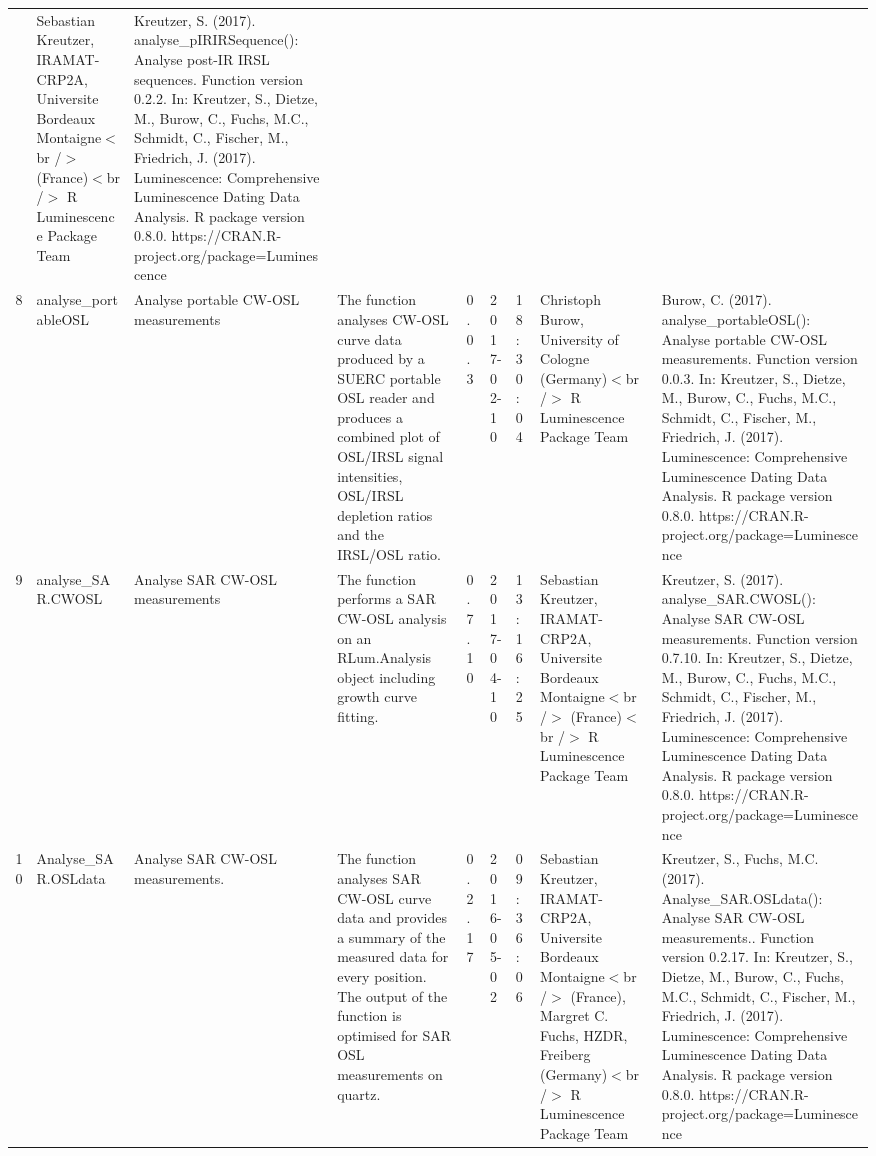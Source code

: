 \begin{table}[ht]
\begin{tabular}{rllllllll}
 & Sebastian Kreutzer, IRAMAT-CRP2A, Universite Bordeaux Montaigne$<$br /$>$ (France)$<$br /$>$  R Luminescence Package Team & Kreutzer, S. (2017). analyse\_pIRIRSequence(): Analyse post-IR IRSL sequences. Function version 0.2.2. In: Kreutzer, S., Dietze, M., Burow, C., Fuchs, M.C., Schmidt, C., Fischer, M., Friedrich, J. (2017). Luminescence: Comprehensive Luminescence Dating Data Analysis. R package version 0.8.0. https://CRAN.R-project.org/package=Luminescence
 \\ 
  8 & analyse\_portableOSL & Analyse portable CW-OSL measurements & The function analyses CW-OSL curve data produced by a SUERC portable OSL reader and produces a combined plot of OSL/IRSL signal intensities, OSL/IRSL depletion ratios and the IRSL/OSL ratio. & 0.0.3 & 2017-02-10 & 18:30:04
 & Christoph Burow, University of Cologne (Germany)$<$br /$>$  R Luminescence Package Team & Burow, C. (2017). analyse\_portableOSL(): Analyse portable CW-OSL measurements. Function version 0.0.3. In: Kreutzer, S., Dietze, M., Burow, C., Fuchs, M.C., Schmidt, C., Fischer, M., Friedrich, J. (2017). Luminescence: Comprehensive Luminescence Dating Data Analysis. R package version 0.8.0. https://CRAN.R-project.org/package=Luminescence
 \\ 
  9 & analyse\_SAR.CWOSL & Analyse SAR CW-OSL measurements & The function performs a SAR CW-OSL analysis on an RLum.Analysis  object including growth curve fitting. & 0.7.10 & 2017-04-10 & 13:16:25
 & Sebastian Kreutzer, IRAMAT-CRP2A, Universite Bordeaux Montaigne$<$br /$>$ (France)$<$br /$>$  R Luminescence Package Team & Kreutzer, S. (2017). analyse\_SAR.CWOSL(): Analyse SAR CW-OSL measurements. Function version 0.7.10. In: Kreutzer, S., Dietze, M., Burow, C., Fuchs, M.C., Schmidt, C., Fischer, M., Friedrich, J. (2017). Luminescence: Comprehensive Luminescence Dating Data Analysis. R package version 0.8.0. https://CRAN.R-project.org/package=Luminescence
 \\ 
  10 & Analyse\_SAR.OSLdata & Analyse SAR CW-OSL measurements. & The function analyses SAR CW-OSL curve data and provides a summary of the measured data for every position. The output of the function is optimised for SAR OSL measurements on quartz. & 0.2.17 & 2016-05-02 & 09:36:06
 & Sebastian Kreutzer, IRAMAT-CRP2A, Universite Bordeaux Montaigne$<$br /$>$ (France), Margret C. Fuchs, HZDR, Freiberg (Germany)$<$br /$>$  R Luminescence Package Team & Kreutzer, S., Fuchs, M.C. (2017). Analyse\_SAR.OSLdata(): Analyse SAR CW-OSL measurements.. Function version 0.2.17. In: Kreutzer, S., Dietze, M., Burow, C., Fuchs, M.C., Schmidt, C., Fischer, M., Friedrich, J. (2017). Luminescence: Comprehensive Luminescence Dating Data Analysis. R package version 0.8.0. https://CRAN.R-project.org/package=Luminescence

\end{tabular}
\end{table}
